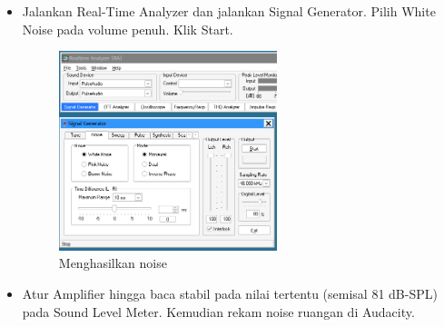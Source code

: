 \documentclass{article}
\begin{document}
\begin{itemize}
		\item Jalankan Real-Time Analyzer dan jalankan Signal Generator.
		Pilih White Noise pada volume penuh. Klik Start.

		\begin{figure}[H]
			\centering
			\includegraphics[width=0.6\textwidth,angle=0]{images/rta_noise_gen}
			\caption{Menghasilkan noise}
		\end{figure}

		\item Atur Amplifier hingga baca stabil pada nilai tertentu (semisal 81 dB-SPL) pada Sound Level Meter.
		Kemudian rekam noise ruangan di Audacity.


\end{itemize}
\end{document}
